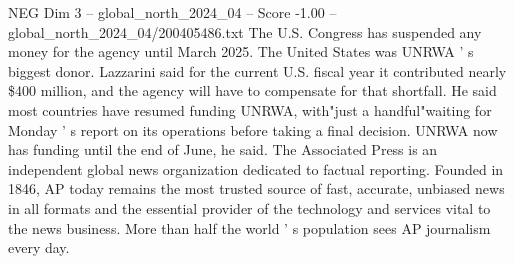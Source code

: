 \begin{textsample}{NEG Dim 3 – global\_north\_2024\_04 – Score -1.00 – global\_north\_2024\_04/200405486.txt}
The U.S.
Congress has suspended any money for the agency until March 2025.
The United States was UNRWA ' s biggest donor.
Lazzarini said for the current U.S. fiscal year it contributed nearly \$400 million, and the agency will have to compensate for that shortfall.
He said most countries have resumed funding UNRWA, with"just a handful"waiting for Monday ' s report on its operations before taking a final decision.
UNRWA now has funding until the end of June, he said.
The Associated Press is an independent global news organization dedicated to factual reporting.
Founded in 1846, AP today remains the most trusted source of fast, accurate, unbiased news in all formats and the essential provider of the technology and services vital to the news business.
More than half the world ' s population sees AP journalism every day.

\end{textsample}
